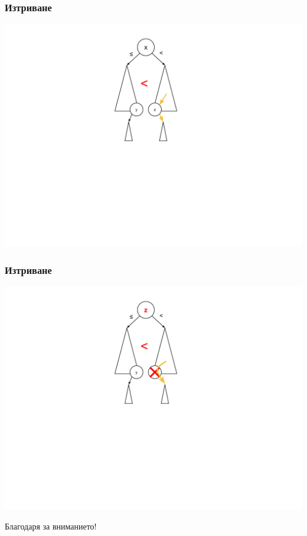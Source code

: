 \documentclass{beamer}
\begin{document}
    
  \begin{frame}[fragile]
  \frametitle{Изтриване}
  
  \includegraphics[width=14cm]{images/tree_delete_2}
  
  \end{frame}

  
  \begin{frame}[fragile]
  \frametitle{Изтриване}
  
  \includegraphics[width=14cm]{images/tree_delete_3}
  
  \end{frame}
  



\begin{frame}
  \centerline{Благодаря за вниманието!}
\end{frame}
\end{document}
